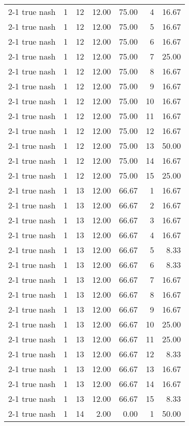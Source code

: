 \begin{tabular}{lrrrrrr}
2-1  true nash & 1 & 12 & 12.00 & 75.00 & 4 & 16.67 \\
2-1  true nash & 1 & 12 & 12.00 & 75.00 & 5 & 16.67 \\
2-1  true nash & 1 & 12 & 12.00 & 75.00 & 6 & 16.67 \\
2-1  true nash & 1 & 12 & 12.00 & 75.00 & 7 & 25.00 \\
2-1  true nash & 1 & 12 & 12.00 & 75.00 & 8 & 16.67 \\
2-1  true nash & 1 & 12 & 12.00 & 75.00 & 9 & 16.67 \\
2-1  true nash & 1 & 12 & 12.00 & 75.00 & 10 & 16.67 \\
2-1  true nash & 1 & 12 & 12.00 & 75.00 & 11 & 16.67 \\
2-1  true nash & 1 & 12 & 12.00 & 75.00 & 12 & 16.67 \\
2-1  true nash & 1 & 12 & 12.00 & 75.00 & 13 & 50.00 \\
2-1  true nash & 1 & 12 & 12.00 & 75.00 & 14 & 16.67 \\
2-1  true nash & 1 & 12 & 12.00 & 75.00 & 15 & 25.00 \\
2-1  true nash & 1 & 13 & 12.00 & 66.67 & 1 & 16.67 \\
2-1  true nash & 1 & 13 & 12.00 & 66.67 & 2 & 16.67 \\
2-1  true nash & 1 & 13 & 12.00 & 66.67 & 3 & 16.67 \\
2-1  true nash & 1 & 13 & 12.00 & 66.67 & 4 & 16.67 \\
2-1  true nash & 1 & 13 & 12.00 & 66.67 & 5 & 8.33 \\
2-1  true nash & 1 & 13 & 12.00 & 66.67 & 6 & 8.33 \\
2-1  true nash & 1 & 13 & 12.00 & 66.67 & 7 & 16.67 \\
2-1  true nash & 1 & 13 & 12.00 & 66.67 & 8 & 16.67 \\
2-1  true nash & 1 & 13 & 12.00 & 66.67 & 9 & 16.67 \\
2-1  true nash & 1 & 13 & 12.00 & 66.67 & 10 & 25.00 \\
2-1  true nash & 1 & 13 & 12.00 & 66.67 & 11 & 25.00 \\
2-1  true nash & 1 & 13 & 12.00 & 66.67 & 12 & 8.33 \\
2-1  true nash & 1 & 13 & 12.00 & 66.67 & 13 & 16.67 \\
2-1  true nash & 1 & 13 & 12.00 & 66.67 & 14 & 16.67 \\
2-1  true nash & 1 & 13 & 12.00 & 66.67 & 15 & 8.33 \\
2-1  true nash & 1 & 14 & 2.00 & 0.00 & 1 & 50.00 \\

\end{tabular}
